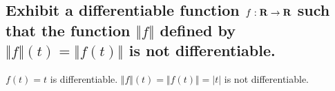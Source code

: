 \begin{parts}
    \part{
        Exhibit a differentiable function
        $f:\mathbf{R}\to\mathbf{R}$ such that the 
        function $\Vert f\Vert$ defined
        by $\Vert f\Vert(t)=\Vert f(t)
        \Vert$ is not differentiable.
    }
    \begin{solution}
        $f(t)=t$ is differentiable.
        $\Vert f\Vert(t)=
        \Vert f(t)\Vert=
        \vert t\vert$ is
        not differentiable.
    \end{solution}
\end{parts}